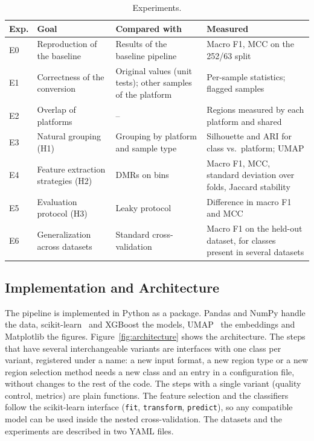 \documentclass[runningheads]{llncs}
\begin{document}
\begin{table}[!htb]
\centering
\caption{Experiments.}
\label{tab:experiments}
\small
\begin{tabular}{l>{\raggedright\arraybackslash}p{3.4cm}>{\raggedright\arraybackslash}p{4.2cm}>{\raggedright\arraybackslash}p{4.8cm}}
\toprule
Exp. & Goal & Compared with & Measured \\
\midrule
E0 & Reproduction of the baseline & Results of the baseline pipeline & Macro F1, MCC on the 252/63 split \\
E1 & Correctness of the conversion & Original values (unit tests); other samples of the platform & Per-sample statistics; flagged samples \\
E2 & Overlap of platforms & -- & Regions measured by each platform and shared \\
E3 & Natural grouping (H1) & Grouping by platform and sample type & Silhouette and ARI for class vs.\ platform; UMAP \\
E4 & Feature extraction strategies (H2) & DMRs on bins & Macro F1, MCC, standard deviation over folds, Jaccard stability \\
E5 & Evaluation protocol (H3) & Leaky protocol & Difference in macro F1 and MCC \\
E6 & Generalization across datasets & Standard cross-validation & Macro F1 on the held-out dataset, for classes present in several datasets \\
\bottomrule
\end{tabular}
\end{table}

\subsection{Implementation and Architecture}
The pipeline is implemented in Python as a package. Pandas and NumPy handle the data, scikit-learn~\cite{pedregosa2011} and XGBoost the models, UMAP~\cite{mcinnes2018} the embeddings and Matplotlib the figures. Figure~\ref{fig:architecture} shows the architecture. The steps that have several interchangeable variants are interfaces with one class per variant, registered under a name: a new input format, a new region type or a new region selection method needs a new class and an entry in a configuration file, without changes to the rest of the code. The steps with a single variant (quality control, metrics) are plain functions. The feature selection and the classifiers follow the scikit-learn interface (\texttt{fit}, \texttt{transform}, \texttt{predict}), so any compatible model can be used inside the nested cross-validation. The datasets and the experiments are described in two YAML files.
\end{document}
